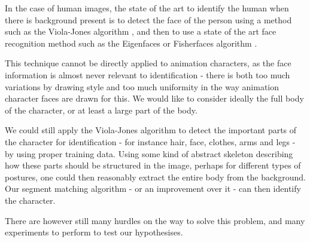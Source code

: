 In the case of human images, the state of the art to identify the human when there is background present is to detect the face of the person using a method such as the Viola-Jones algorithm \cite{viola2004robust}, and then to use a state of the art face recognition method such as the Eigenfaces or Fisherfaces algorithm \cite{turk1991eigenfaces} \cite{belhumeur1997eigenfaces}.

This technique cannot be directly applied to animation characters, as the face information is almost never relevant to identification - there is both too much variations by drawing style and too much uniformity in the way animation character faces are drawn for this. We would like to consider ideally the full body of the character, or at least a large part of the body.

We could still apply the Viola-Jones algorithm to detect the important parts of the character for identification - for instance hair, face, clothes, arms and legs - by using proper training data. Using some kind of abstract skeleton describing how these parts should be structured in the image, perhaps for different types of postures, one could then reasonably extract the entire body from the background. Our segment matching algorithm - or an improvement over it - can then identify the character.

There are however still many hurdles on the way to solve this problem, and many experiments to perform to test our hypothesises.